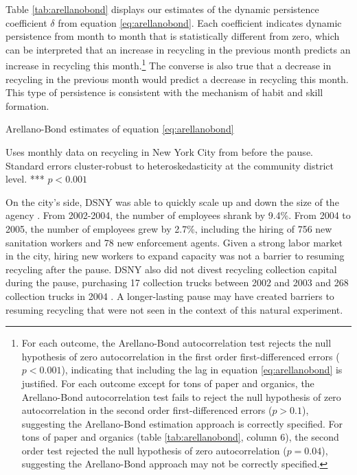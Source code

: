 \documentclass[12pt]{article}
\begin{document}
Table \ref{tab:arellanobond} displays our estimates of the dynamic persistence coefficient \(\delta\) from equation \ref{eq:arellanobond}.  Each coefficient indicates dynamic persistence from month to month that is statistically different from zero, which can be interpreted that an increase in recycling in the previous month predicts an increase in recycling this month.\footnote{For each outcome, the Arellano-Bond autocorrelation test rejects the null hypothesis of zero autocorrelation in the first order first-differenced errors (\(p<0.001\)), indicating that including the lag in equation \ref{eq:arellanobond} is justified.  For each outcome except for tons of paper and organics, the Arellano-Bond autocorrelation test fails to reject the null hypothesis of zero autocorrelation in the second order first-differenced errors (\(p>0.1\)), suggesting the Arellano-Bond estimation approach is correctly specified.  For tons of paper and organics (table \ref{tab:arellanobond}, column 6), the second order test rejected the null hypothesis of zero autocorrelation (\(p=0.04\)), suggesting the Arellano-Bond approach may not be correctly specified.}  The converse is also true that a decrease in recycling in the previous month would predict a decrease in recycling this month.  This type of persistence is consistent with the mechanism of habit and skill formation.

\begin{table}
    \centering
    \begin{threeparttable}
    \caption{Arellano-Bond estimates of equation \ref{eq:arellanobond}}
    \label{tab:arellanobond}
    
    \begin{tablenotes}[flushleft]
    \scriptsize{Uses monthly data on recycling in New York City from before the pause. Standard errors cluster-robust to heteroskedasticity at the community district level. *** \(p<0.001\)}
    \end{tablenotes}
    \end{threeparttable}
\end{table}

On the city's side, DSNY was able to quickly scale up and down the size of the agency \citep{dsnyreports}.  From 2002-2004, the number of employees shrank by 9.4\%.  From 2004 to 2005, the number of employees grew by 2.7\%, including the hiring of 756 new sanitation workers and 78 new enforcement agents.  Given a strong labor market in the city, hiring new workers to expand capacity was not a barrier to resuming recycling after the pause.  DSNY also did not divest recycling collection capital during the pause, purchasing 17 collection trucks between 2002 and 2003 and 268 collection trucks in 2004 \citep{dsnyreports}.  A longer-lasting pause may have created barriers to resuming recycling that were not seen in the context of this natural experiment.
\end{document}
